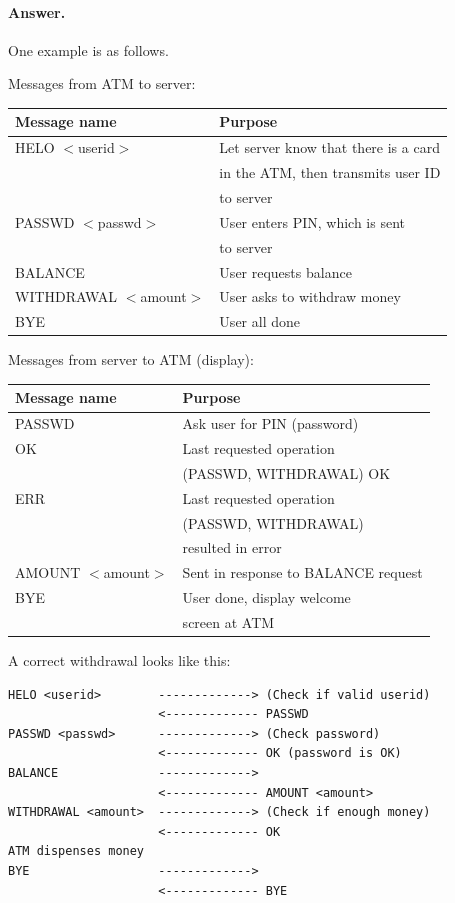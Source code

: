 \paragraph{Answer.} One example is as follows.

\noindent Messages from ATM to server:

  {\small
  \begin{tabular}{l|l}
  Message name & Purpose\\
  \hline \hline
  HELO \(<\)userid\(>\)   & Let server know that there is a card\\
                          & in the ATM, then transmits user ID\\
                          & to server\\
  PASSWD \(<\)passwd\(>\) & User enters PIN, which is sent\\
                          & to server\\
  BALANCE                 & User requests balance\\
  WITHDRAWAL \(<\)amount\(>\)
                          & User asks to withdraw money\\
  BYE                     & User all done
  \end{tabular}
  }

  \bigskip

\noindent Messages from server to ATM (display):

  \begin{tabular}{l|l}
  Message name & Purpose\\
  \hline \hline
  PASSWD  & Ask user for PIN (password)\\
  OK      & Last requested operation\\
          & (PASSWD, WITHDRAWAL) OK\\
  ERR     & Last requested operation\\
          & (PASSWD, WITHDRAWAL)\\
          & resulted in error\\
  AMOUNT \(<\)amount\(>\) & Sent in response to
                            BALANCE request\\
  BYE     & User done, display welcome\\
          & screen at ATM
  \end{tabular}

\bigskip

\noindent A correct withdrawal looks like this:
{\small
  \begin{verbatim}
HELO <userid>        -------------> (Check if valid userid)
                     <------------- PASSWD
PASSWD <passwd>      -------------> (Check password)
                     <------------- OK (password is OK)
BALANCE              ------------->
                     <------------- AMOUNT <amount>
WITHDRAWAL <amount>  -------------> (Check if enough money)
                     <------------- OK
ATM dispenses money
BYE                  ------------->
                     <------------- BYE
  \end{verbatim}
}
